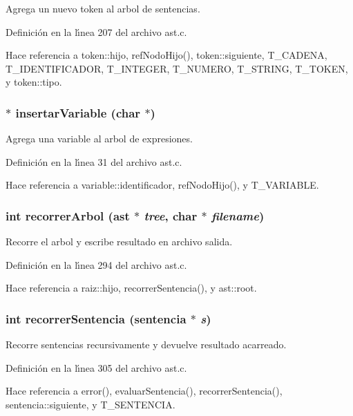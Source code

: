Agrega un nuevo token al arbol de sentencias. 



Definici\'{o}n en la l\'{\i}nea 207 del archivo ast.c.

Hace referencia a token::hijo, ref\-Nodo\-Hijo(), token::siguiente, T\_\-CADENA, T\_\-IDENTIFICADOR, T\_\-INTEGER, T\_\-NUMERO, T\_\-STRING, T\_\-TOKEN, y token::tipo.
\subsubsection{$\ast$ insertar\-Variable (char $\ast$)}\label{ast_8h_a18}


Agrega una variable al arbol de expresiones. 



Definici\'{o}n en la l\'{\i}nea 31 del archivo ast.c.

Hace referencia a variable::identificador, ref\-Nodo\-Hijo(), y T\_\-VARIABLE.
\subsubsection{\setlength{\rightskip}{0pt plus 5cm}int recorrer\-Arbol ({\bf ast} $\ast$ {\em tree}, char $\ast$ {\em filename})}\label{ast_8h_a35}


Recorre el arbol y escribe resultado en archivo salida. 



Definici\'{o}n en la l\'{\i}nea 294 del archivo ast.c.

Hace referencia a raiz::hijo, recorrer\-Sentencia(), y ast::root.
\subsubsection{\setlength{\rightskip}{0pt plus 5cm}int recorrer\-Sentencia ({\bf sentencia} $\ast$ {\em s})}\label{ast_8h_a36}


Recorre sentencias recursivamente y devuelve resultado acarreado. 



Definici\'{o}n en la l\'{\i}nea 305 del archivo ast.c.

Hace referencia a error(), evaluar\-Sentencia(), recorrer\-Sentencia(), sentencia::siguiente, y T\_\-SENTENCIA.

